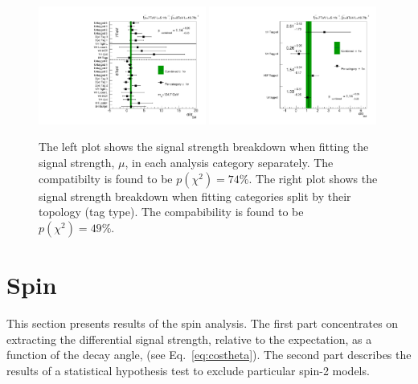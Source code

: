 \begin{figure}
  \includegraphics[width=0.49\textwidth]{results/plots/mva_chcomp.pdf}
  \includegraphics[width=0.49\textwidth]{results/plots/mva_topo_scan.pdf}
  \caption[The observed compatibility of the signal strength between channels]{The left plot shows the signal strength breakdown when fitting the signal strength, $\mu$, in each analysis category separately. The compatibilty is found to be $p(\chi^{2})=74\%$. The right plot shows the signal strength breakdown when fitting categories split by their topology (tag type). The compabibility is found to be $p(\chi^{2})=49\%$.}
  \label{fig:res_chcomp}
\end{figure}

\section{Spin}
\label{sec:spin_results}

This section presents results of the spin analysis. The first part concentrates on extracting the differential signal strength, relative to the \SM expectation, as a function of the decay angle, \costhetastar (see Eq.~\ref{eq:costheta}). The second part describes the results of a statistical hypothesis test to exclude particular spin-2 models.

